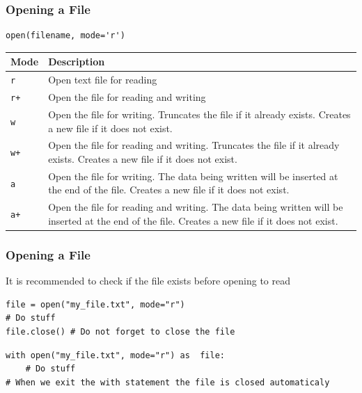 \documentclass[11pt]{beamer}
\begin{document}
\begin{frame}[fragile]\frametitle{Opening a File}
\begin{lstlisting}[basicstyle=\small]
open(filename, mode='r')
\end{lstlisting}
\small
\begin{tabularx}{\textwidth}{lX}
\toprule
\textbf{Mode} & \textbf{Description} \\ 
\midrule
\texttt{r}    & Open text file for reading \\
\texttt{r+}   & Open the file for reading and writing \\
\texttt{w}    & Open the file for writing. Truncates the file if it already exists. Creates a new file if it does not exist. \\
\texttt{w+}   & Open the file for reading and writing. Truncates the file if it already exists. Creates a new file if it does not exist. \\
\texttt{a}    & Open the file for writing. The data being written will be inserted at the end of the file. Creates a new file if it does not exist. \\
\texttt{a+}   & Open the file for reading and writing. The data being written will be inserted at the end of the file. Creates a new file if it does not exist. \\
\bottomrule
\end{tabularx}
\end{frame}


\begin{frame}[fragile]\frametitle{Opening a File}
\begin{block}{}
\centering It is recommended to check if the file exists before opening to read
\end{block}
\begin{lstlisting}[basicstyle=\small]
file = open("my_file.txt", mode="r")
# Do stuff
file.close() # Do not forget to close the file
\end{lstlisting}
\begin{lstlisting}[basicstyle=\small]
with open("my_file.txt", mode="r") as  file:
    # Do stuff
# When we exit the with statement the file is closed automaticaly
\end{lstlisting}
\end{frame}
\end{document}

